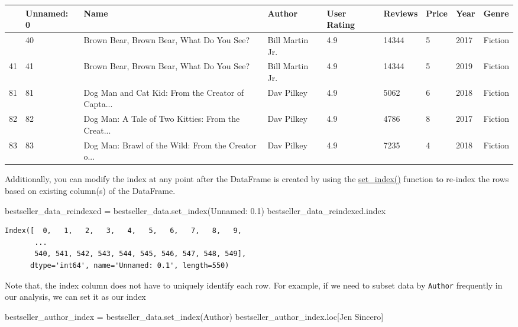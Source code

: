 \documentclass[
  letterpaper,
  DIV=11,
  numbers=noendperiod]{scrreprt}
\newenvironment{Shaded}{\begin{snugshade}}{\end{snugshade}}
\newcommand{\NormalTok}[1]{\textcolor[rgb]{0.00,0.23,0.31}{#1}}
\newcommand{\OperatorTok}[1]{\textcolor[rgb]{0.37,0.37,0.37}{#1}}
\newcommand{\StringTok}[1]{\textcolor[rgb]{0.13,0.47,0.30}{#1}}
\begin{document}
\begin{longtable}[]{@{}lllllllll@{}}
\toprule\noalign{}
& Unnamed: 0 & Name & Author & User Rating & Reviews & Price & Year &
Genre \\
\midrule\noalign{}
\endhead
\bottomrule\noalign{}
\endlastfoot
40 & 40 & Brown Bear, Brown Bear, What Do You See? & Bill Martin Jr. &
4.9 & 14344 & 5 & 2017 & Fiction \\
41 & 41 & Brown Bear, Brown Bear, What Do You See? & Bill Martin Jr. &
4.9 & 14344 & 5 & 2019 & Fiction \\
81 & 81 & Dog Man and Cat Kid: From the Creator of Capta... & Dav Pilkey
& 4.9 & 5062 & 6 & 2018 & Fiction \\
82 & 82 & Dog Man: A Tale of Two Kitties: From the Creat... & Dav Pilkey
& 4.9 & 4786 & 8 & 2017 & Fiction \\
83 & 83 & Dog Man: Brawl of the Wild: From the Creator o... & Dav Pilkey
& 4.9 & 7235 & 4 & 2018 & Fiction \\
\end{longtable}

Additionally, you can modify the index at any point after the DataFrame
is created by using the
\href{https://pandas.pydata.org/docs/reference/api/pandas.DataFrame.set_index.html}{set\_index()}
function to re-index the rows based on existing column(s) of the
DataFrame.

\begin{Shaded}
\begin{Highlighting}[]
\NormalTok{bestseller\_data\_reindexed }\OperatorTok{=}\NormalTok{ bestseller\_data.set\_index(}\StringTok{\textquotesingle{}Unnamed: 0.1\textquotesingle{}}\NormalTok{)}
\NormalTok{bestseller\_data\_reindexed.index}
\end{Highlighting}
\end{Shaded}

\begin{verbatim}
Index([  0,   1,   2,   3,   4,   5,   6,   7,   8,   9,
       ...
       540, 541, 542, 543, 544, 545, 546, 547, 548, 549],
      dtype='int64', name='Unnamed: 0.1', length=550)
\end{verbatim}

Note that, the index column does not have to uniquely identify each row.
For example, if we need to subset data by \texttt{Author} frequently in
our analysis, we can set it as our index

\begin{Shaded}
\begin{Highlighting}[]
\NormalTok{bestseller\_author\_index }\OperatorTok{=}\NormalTok{ bestseller\_data.set\_index(}\StringTok{\textquotesingle{}Author\textquotesingle{}}\NormalTok{)}
\NormalTok{bestseller\_author\_index.loc[}\StringTok{\textquotesingle{}Jen Sincero\textquotesingle{}}\NormalTok{]}
\end{Highlighting}
\end{Shaded}
\end{document}
